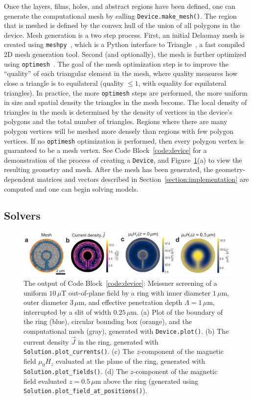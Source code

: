 \documentclass[final,3p,times,twocolumn]{elsarticle}
\newcommand{\inline}[1]{\texttt{#1}\xspace}
\newcommand{\um}{\mu\mathrm{m}}
\begin{document}
Once the layers, films, holes, and abstract regions have been defined, one can generate the computational mesh by calling \inline{Device.make_mesh()}. The region that is meshed is defined by the convex hull of the union of all polygons in the device. Mesh generation is a two step process. First, an initial Delaunay mesh is created using \inline{meshpy}~\cite{Klockner}, which is a Python interface to Triangle~\cite{Shewchuk1996-va, Shewchuk}, a fast compiled 2D mesh generation tool. Second (and optionally), the mesh is further optimized using \inline{optimesh}~\cite{Schlomer2021-ua}. The goal of the mesh optimization step is to improve the ``quality'' of each triangular element in the mesh, where quality measures how close a triangle is to equilateral (quality $\leq1$, with equality for equilateral triangles). In practice, the more \inline{optimesh} steps are performed, the more uniform in size and spatial density the triangles in the mesh become. The local density of triangles in the mesh is determined by the density of vertices in the device's polygons and the total number of triangles. Regions where there are many polygon vertices will be meshed more densely than regions with few polygon vertices. If no \inline{optimesh} optimization is performed, then every polygon vertex is guaranteed to be a mesh vertex. See Code Block~\ref{code:device} for a demonstration of the process of creating a \inline{Device}, and Figure~\ref{fig:ring-with-slit}(a) to view the resulting geometry and mesh. After the mesh has been generated, the geometry-dependent matrices and vectors described in Section~\ref{section:implementation} are computed and one can begin solving models.

\subsection{Solvers}
\label{section:overview:solvers}
\begin{figure}
    \centering
    \includegraphics[width=\textwidth]{examples/images/ring_with_slit.pdf}
    \caption{The output of Code Block~\ref{code:device}: Meissner screening of a uniform $10\,\mu\mathrm{T}$ out-of-plane field by a ring with inner diameter $1\,\um$, outer diameter $3\,\um$, and effective penetration depth $\Lambda=1\,\um$, interrupted by a slit of width $0.25\,\um$. (a) Plot of the boundary of the ring (blue), circular bounding box (orange), and the computational mesh (gray), generated with \inline{Device.plot()}. (b) The current density $\vec{J}$ in the ring, generated with \inline{Solution.plot_currents()}. (c) The $z$-component of the magnetic field $\mu_0H_z$ evaluated at the plane of the ring, generated with \inline{Solution.plot_fields()}. (d) The $z$-component of the magnetic field evaluated $z=0.5\,\um$ above the ring (generated using \inline{Solution.plot_field_at_positions()}).}
    \label{fig:ring-with-slit}
\end{figure}
\end{document}
